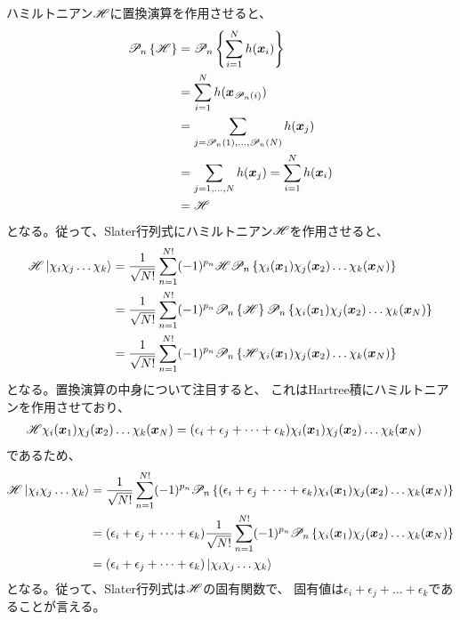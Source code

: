ハミルトニアン${\mathscr{H}}$に置換演算を作用させると、
\begin{align}
	\mathscr{P}_n\left\{
		\H
	\right\}
&=
	\mathscr{P}_n\left\{
		\sum_{i=1}^{N} h(\x_i)
	\right\} \\
%
%
&=
	\sum_{i=1}^{N} h(\x_{\mathscr{P}_n(i)}) \\
%
%
&=
	\sum_{j=\mathscr{P}_n(1),\dots,\mathscr{P}_n(N)} h(\x_j) \\
%
%
&=
	\sum_{j=1,\dots,N} h(\x_j)
%
%
=
	\sum_{i=1}^{N} h(\x_i) \\
%
%
&=
	\H
\end{align}
となる。従って、Slater行列式にハミルトニアン${\mathscr{H}}$を作用させると、
\begin{align}
	\H\ket{\chi_i\chi_j\dots\chi_k}
&=
	\frac{1}{\sqrt{N!}}
	\sum_{n=1}^{N!}
		(-1)^{p_n}
		\H
		\mathscr{P}_n\left\{
			\chi_i(\x_1) \chi_j(\x_2) \dots \chi_k(\x_N)
		\right\} \\
%
%
&=
	\frac{1}{\sqrt{N!}}
	\sum_{n=1}^{N!}
		(-1)^{p_n}
		\mathscr{P}_n\left\{
			\H
		\right\}
		\mathscr{P}_n\left\{
			\chi_i(\x_1) \chi_j(\x_2) \dots \chi_k(\x_N)
		\right\} \\
%
%
&=
	\frac{1}{\sqrt{N!}}
	\sum_{n=1}^{N!}
		(-1)^{p_n}
		\mathscr{P}_n\left\{
			\H
			\chi_i(\x_1) \chi_j(\x_2) \dots \chi_k(\x_N)
		\right\}
\end{align}
となる。置換演算の中身について注目すると、
これはHartree積にハミルトニアンを作用させており、
\begin{align}
	{\ensuremath{\mathscr{H}}}
	\chi_i({\bm{x}}_1) \chi_j({\bm{x}}_2) \dots \chi_k({\bm{x}}_N)
&=
	(\epsilon_i+\epsilon_j+\dots+\epsilon_k)
	\chi_i({\bm{x}}_1) \chi_j({\bm{x}}_2) \dots \chi_k({\bm{x}}_N)
\end{align}
であるため、
\begin{align}
	\H\ket{\chi_i\chi_j\dots\chi_k}
&=
	\frac{1}{\sqrt{N!}}
	\sum_{n=1}^{N!}
		(-1)^{p_n}
		\mathscr{P}_n\left\{
			(\epsilon_i+\epsilon_j+\dots+\epsilon_k)
			\chi_i(\x_1) \chi_j(\x_2) \dots \chi_k(\x_N)
		\right\} \\
%
%
&=
	(\epsilon_i+\epsilon_j+\dots+\epsilon_k)
	\frac{1}{\sqrt{N!}}
	\sum_{n=1}^{N!}
		(-1)^{p_n}
		\mathscr{P}_n\left\{
			\chi_i(\x_1) \chi_j(\x_2) \dots \chi_k(\x_N)
		\right\} \\
%
%
&=
	(\epsilon_i+\epsilon_j+\dots+\epsilon_k)
	\ket{\chi_i\chi_j\dots\chi_k}
\end{align}
となる。従って、Slater行列式は${\mathscr{H}}$の固有関数で、
固有値は$\epsilon_i+\epsilon_j+\dots+\epsilon_k$であることが言える。









